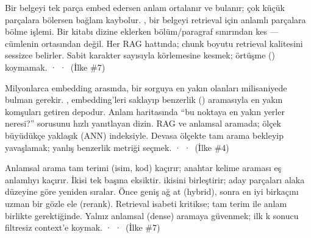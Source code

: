 
 Bir belgeyi tek parça embed edersen anlam ortalanır ve bulanır;
çok küçük parçalara bölersen bağlam kaybolur.
 , bir belgeyi retrieval için anlamlı parçalara bölme işlemi.
 Bir kitabı dizine eklerken bölüm/paragraf sınırından kes --- cümlenin ortasından değil.
 Her RAG hattında; chunk boyutu retrieval kalitesini sessizce belirler.
 Sabit karakter sayısıyla körlemesine kesmek; örtüşme () koymamak.
  ·  ·  \,{\scriptsize\color{softgray}(İlke \#7)}

 Milyonlarca embedding arasında, bir sorguya en yakın olanları
milisaniyede bulman gerekir.
 , embedding'leri saklayıp benzerlik ()
aramasıyla en yakın komşuları getiren depodur.
 Anlam haritasında ``bu noktaya en yakın yerler neresi?'' sorusunu hızlı yanıtlayan dizin.
 RAG ve anlamsal aramada; ölçek büyüdükçe yaklaşık (ANN) indeksiyle.
 Devasa ölçekte tam arama bekleyip yavaşlamak; yanlış benzerlik metriği seçmek.
  ·  ·  \,{\scriptsize\color{softgray}(İlke \#4)}

 Anlamsal arama tam terimi (isim, kod) kaçırır; anahtar kelime
araması eş anlamlıyı kaçırır. İkisi tek başına eksiktir.
  ikisini birleştirir;  aday
parçaları alaka düzeyine göre yeniden sıralar.
 Önce geniş ağ at (hybrid), sonra en iyi birkaçını uzman bir gözle ele (rerank).
 Retrieval isabeti kritikse; tam terim ile anlam birlikte gerektiğinde.
 Yalnız anlamsal (dense) aramaya güvenmek; ilk k sonucu filtresiz context'e koymak.
  ·  ·  \,{\scriptsize\color{softgray}(İlke \#7)}
